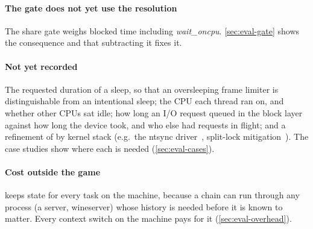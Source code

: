 \paragraph{The gate does not yet use the resolution} The share gate weighs
blocked time including \textit{wait\_oncpu}. \autoref{sec:eval-gate}
shows the consequence and that subtracting it fixes it.

\paragraph{Not yet recorded} The requested duration of a sleep, so that an
oversleeping frame limiter is distinguishable from an intentional sleep; the
CPU each thread ran on, and whether other CPUs sat idle; how long an I/O
request queued in the block layer against how long the device took, and who
else had requests in flight; and a refinement of  by
kernel stack (e.g.\ the ntsync driver~\cite{ntsync}, split-lock
mitigation~\cite{lwn-splitlock}). The case studies show where each is needed
(\autoref{sec:eval-cases}). 

\paragraph{Cost outside the game} \sys keeps state for every task on the
machine, because a chain can run through any process (a server, wineserver)
whose history is needed before it is known to matter. Every context switch
on the machine pays for it (\autoref{sec:eval-overhead}).
